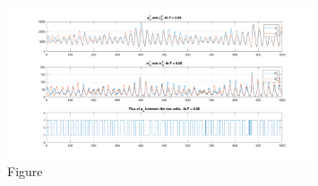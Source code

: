 \documentclass[12pt]{article}
\renewcommand{\(}{\left (}
\renewcommand{\)}{\right )}
\begin{document}
\begin{figure}[ht]
    \centering
	\begin{minipage}{0.99\textwidth}
		\centering
		\includegraphics[width=0.8\textwidth]{sto_two_cell_same_period_diff_states_F08.png}
		\caption*{\small Figure}
	\end{minipage}
\end{figure}

\end{document}
